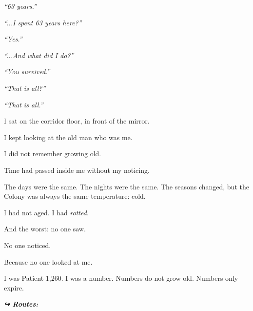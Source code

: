 \noindent \textit{\textquotedblleft{}63 years.\textquotedblright{}}

\noindent \textit{\textquotedblleft{}...I spent 63 years here?\textquotedblright{}}

\noindent \textit{\textquotedblleft{}Yes.\textquotedblright{}}

\noindent \textit{\textquotedblleft{}...And what did I do?\textquotedblright{}}

\noindent \textit{\textquotedblleft{}You survived.\textquotedblright{}}

\noindent \textit{\textquotedblleft{}That is all?\textquotedblright{}}

\noindent \textit{\textquotedblleft{}That is all.\textquotedblright{}}

\noindent I sat on the corridor floor, in front of the mirror.

\noindent I kept looking at the old man who was me.

\noindent I did not remember growing old.

\noindent Time had passed inside me without my noticing.

\noindent The days were the same. The nights were the same. The seasons changed, but the Colony was always the same temperature: cold.

\noindent I had not aged.
I had \textit{rotted}.

\noindent And the worst: no one saw.

\noindent No one noticed.

\noindent Because no one looked at me.

\noindent I was Patient 1,260.
I was a number.
Numbers do not grow old.
Numbers only expire.

\vspace{0.5em}
\noindent\textit{\textbf{↪ Routes:}  \rotasep {}}
